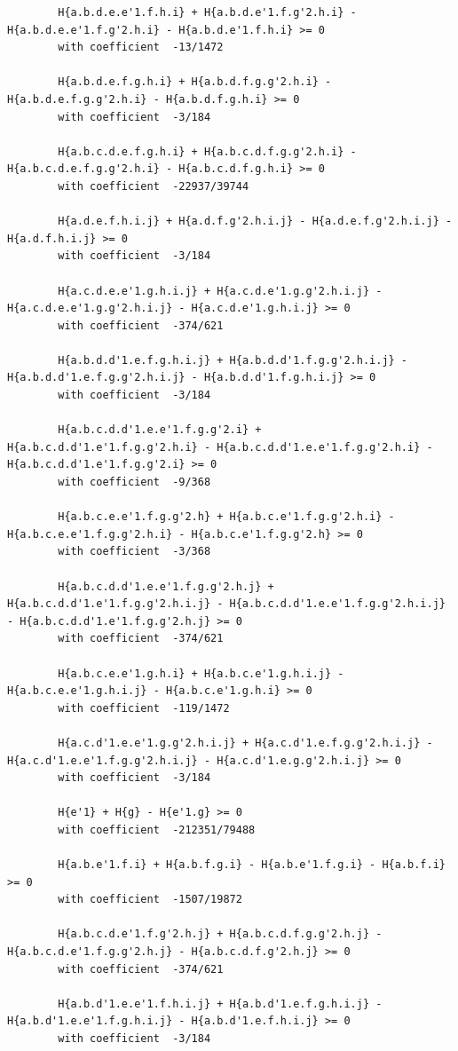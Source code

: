 \documentclass[11pt, a4paper]{kybernetika}
\begin{document}
\begin{verbatim}
		H{a.b.d.e.e'1.f.h.i} + H{a.b.d.e'1.f.g'2.h.i} - H{a.b.d.e.e'1.f.g'2.h.i} - H{a.b.d.e'1.f.h.i} >= 0
		with coefficient  -13/1472
		
		H{a.b.d.e.f.g.h.i} + H{a.b.d.f.g.g'2.h.i} - H{a.b.d.e.f.g.g'2.h.i} - H{a.b.d.f.g.h.i} >= 0
		with coefficient  -3/184
		
		H{a.b.c.d.e.f.g.h.i} + H{a.b.c.d.f.g.g'2.h.i} - H{a.b.c.d.e.f.g.g'2.h.i} - H{a.b.c.d.f.g.h.i} >= 0
		with coefficient  -22937/39744
		
		H{a.d.e.f.h.i.j} + H{a.d.f.g'2.h.i.j} - H{a.d.e.f.g'2.h.i.j} - H{a.d.f.h.i.j} >= 0
		with coefficient  -3/184
		
		H{a.c.d.e.e'1.g.h.i.j} + H{a.c.d.e'1.g.g'2.h.i.j} - H{a.c.d.e.e'1.g.g'2.h.i.j} - H{a.c.d.e'1.g.h.i.j} >= 0
		with coefficient  -374/621
		
		H{a.b.d.d'1.e.f.g.h.i.j} + H{a.b.d.d'1.f.g.g'2.h.i.j} - H{a.b.d.d'1.e.f.g.g'2.h.i.j} - H{a.b.d.d'1.f.g.h.i.j} >= 0
		with coefficient  -3/184
		
		H{a.b.c.d.d'1.e.e'1.f.g.g'2.i} + H{a.b.c.d.d'1.e'1.f.g.g'2.h.i} - H{a.b.c.d.d'1.e.e'1.f.g.g'2.h.i} - H{a.b.c.d.d'1.e'1.f.g.g'2.i} >= 0
		with coefficient  -9/368
		
		H{a.b.c.e.e'1.f.g.g'2.h} + H{a.b.c.e'1.f.g.g'2.h.i} - H{a.b.c.e.e'1.f.g.g'2.h.i} - H{a.b.c.e'1.f.g.g'2.h} >= 0
		with coefficient  -3/368
		
		H{a.b.c.d.d'1.e.e'1.f.g.g'2.h.j} + H{a.b.c.d.d'1.e'1.f.g.g'2.h.i.j} - H{a.b.c.d.d'1.e.e'1.f.g.g'2.h.i.j} - H{a.b.c.d.d'1.e'1.f.g.g'2.h.j} >= 0
		with coefficient  -374/621
		
		H{a.b.c.e.e'1.g.h.i} + H{a.b.c.e'1.g.h.i.j} - H{a.b.c.e.e'1.g.h.i.j} - H{a.b.c.e'1.g.h.i} >= 0
		with coefficient  -119/1472
		
		H{a.c.d'1.e.e'1.g.g'2.h.i.j} + H{a.c.d'1.e.f.g.g'2.h.i.j} - H{a.c.d'1.e.e'1.f.g.g'2.h.i.j} - H{a.c.d'1.e.g.g'2.h.i.j} >= 0
		with coefficient  -3/184
		
		H{e'1} + H{g} - H{e'1.g} >= 0
		with coefficient  -212351/79488
		
		H{a.b.e'1.f.i} + H{a.b.f.g.i} - H{a.b.e'1.f.g.i} - H{a.b.f.i} >= 0
		with coefficient  -1507/19872
		
		H{a.b.c.d.e'1.f.g'2.h.j} + H{a.b.c.d.f.g.g'2.h.j} - H{a.b.c.d.e'1.f.g.g'2.h.j} - H{a.b.c.d.f.g'2.h.j} >= 0
		with coefficient  -374/621
		
		H{a.b.d'1.e.e'1.f.h.i.j} + H{a.b.d'1.e.f.g.h.i.j} - H{a.b.d'1.e.e'1.f.g.h.i.j} - H{a.b.d'1.e.f.h.i.j} >= 0
		with coefficient  -3/184
		

\end{verbatim}
\end{document}
